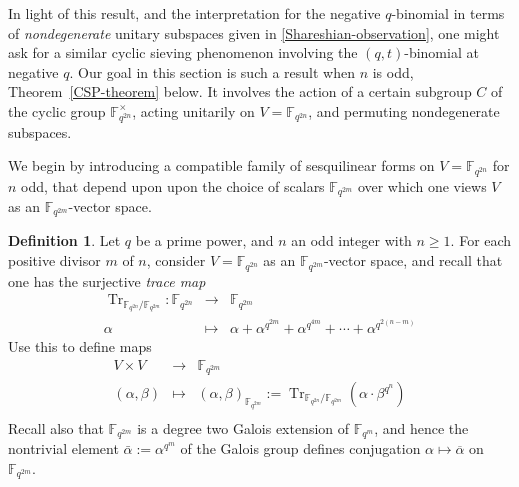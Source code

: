 \documentclass[10pt]{amsart}
\theoremstyle{plain}
\theoremstyle{definition}
\newtheorem{definition}[theorem]{Definition}
\theoremstyle{remark}
\numberwithin{equation}{section}
\newcommand\Tr{\operatorname{Tr}}
\newcommand\FF{\mathbb{F}}
\begin{document}
In light of this result, and the interpretation for
the negative $q$-binomial in terms of {\it nondegenerate}
unitary subspaces given in \eqref{Shareshian-observation},
one might ask for a similar cyclic sieving phenomenon
involving the $(q,t)$-binomial at negative $q$.
Our goal in this section is such a result when $n$ is odd, 
Theorem~\ref{CSP-theorem} below.  
It involves the action of a certain subgroup $C$ of the cyclic
group $\FF_{q^{2n}}^\times$, acting unitarily on $V=\FF_{q^{2n}}$,
and permuting nondegenerate subspaces.

We begin by introducing a compatible family of 
sesquilinear forms on $V=\FF_{q^{2n}}$ for $n$ odd,
that depend upon upon the choice of scalars $\FF_{q^{2m}}$ 
over which one views $V$ as an $\FF_{q^{2m}}$-vector space.

\begin{definition}
Let $q$ be a prime power, and $n$ an odd integer
with
$n \geq 1$.  For each positive divisor $m$ of $n$,
consider $V=\FF_{q^{2n}}$ as an $\FF_{q^{2m}}$-vector space,
and recall that one has the surjective {\it trace map}
$$
\begin{array}{rcl}
\Tr_{\FF_{q^{2n}}/\FF_{q^{2m}}}: \FF_{q^{2n}} 
&\longrightarrow &
\FF_{q^{2m}} \\
\alpha &\longmapsto & 
\alpha + \alpha^{q^{2m}} +\alpha^{q^{4m}} + \cdots + \alpha^{q^{2(n-m)}} 
\end{array}
$$
Use this to define maps
$$
\begin{array}{rcl}
V \times V & \longrightarrow & \FF_{q^{2m}} \\
(\alpha, \beta)& \longmapsto & 
  (\alpha,\beta)_{\FF_{q^{2m}}}:= 
  \Tr_{\FF_{q^{2n}}/\FF_{q^{2m}}} \left(\alpha \cdot \beta^{q^n} \right) \\
\end{array}
$$
Recall also that $\FF_{q^{2m}}$ is a degree two Galois extension of $\FF_{q^m}$,
and hence the nontrivial element $\bar{\alpha}:=\alpha^{q^m}$
of the Galois group defines conjugation $\alpha \mapsto \overline{\alpha}$ on $\FF_{q^{2m}}$.
\end{definition}
\end{document}
